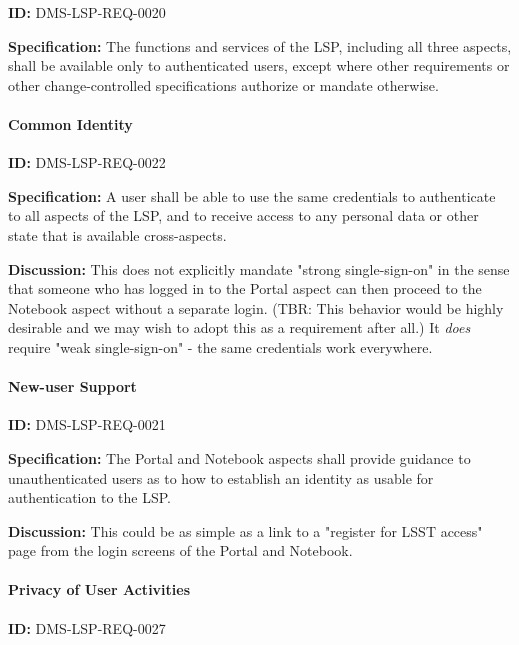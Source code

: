 \documentclass[SE,toc,lsstdraft]{lsstdoc}
\begin{document}
\label{DMS-LSP-REQ-0020}
\textbf{ID:} DMS-LSP-REQ-0020

\textbf{Specification:}
The functions and services of the LSP, including all three aspects, shall be available only to authenticated users, except where other requirements or other change-controlled specifications authorize or mandate otherwise.

\paragraph{Common Identity}\hfill  %

\label{DMS-LSP-REQ-0022}
\textbf{ID:} DMS-LSP-REQ-0022

\textbf{Specification:}
A user shall be able to use the same credentials to authenticate to all aspects of the LSP, and to receive access to any personal data or other state that is available cross-aspects.

\textbf{Discussion:}
This does not explicitly mandate "strong single-sign-on" in the sense that someone who has logged in to the Portal aspect can then proceed to the Notebook aspect without a separate login. (TBR: This behavior would be highly desirable and we may wish to adopt this as a requirement after all.) It \textit{does} require "weak single-sign-on" - the same credentials work everywhere.

\paragraph{New-user Support}\hfill  %

\label{DMS-LSP-REQ-0021}
\textbf{ID:} DMS-LSP-REQ-0021

\textbf{Specification:}
The Portal and Notebook aspects shall provide guidance to unauthenticated users as to how to establish an identity as usable for authentication to the LSP.

\textbf{Discussion:}
This could be as simple as a link to a "register for LSST access" page from the login screens of the Portal and Notebook.

\paragraph{Privacy of User Activities}\hfill  %

\label{DMS-LSP-REQ-0027}
\textbf{ID:} DMS-LSP-REQ-0027
\end{document}
